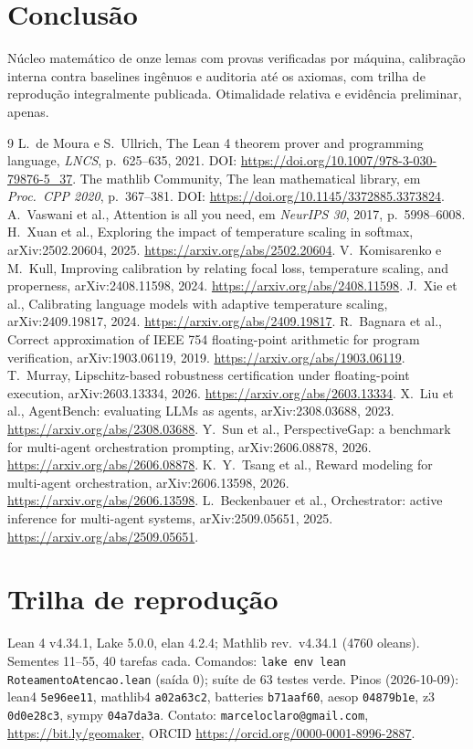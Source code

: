 \documentclass[11pt,a4paper]{article}
\theoremstyle{definition}
\begin{document}
\section{Conclusão}
Núcleo matemático de onze lemas com provas verificadas por máquina, calibração interna contra baselines ingênuos e auditoria até os axiomas, com trilha de reprodução integralmente publicada. Otimalidade relativa e evidência preliminar, apenas.
\begin{thebibliography}{9}
 L.~de Moura e S.~Ullrich, The Lean 4 theorem prover and programming language, \textit{LNCS}, p.\ 625--635, 2021. DOI: \url{https://doi.org/10.1007/978-3-030-79876-5_37}.
 The mathlib Community, The lean mathematical library, em \textit{Proc.\ CPP 2020}, p.\ 367--381. DOI: \url{https://doi.org/10.1145/3372885.3373824}.
 A.~Vaswani et al., Attention is all you need, em \textit{NeurIPS 30}, 2017, p.\ 5998--6008.
 H.~Xuan et al., Exploring the impact of temperature scaling in softmax, arXiv:2502.20604, 2025. \url{https://arxiv.org/abs/2502.20604}.
 V.~Komisarenko e M.~Kull, Improving calibration by relating focal loss, temperature scaling, and properness, arXiv:2408.11598, 2024. \url{https://arxiv.org/abs/2408.11598}.
 J.~Xie et al., Calibrating language models with adaptive temperature scaling, arXiv:2409.19817, 2024. \url{https://arxiv.org/abs/2409.19817}.
 R.~Bagnara et al., Correct approximation of IEEE 754 floating-point arithmetic for program verification, arXiv:1903.06119, 2019. \url{https://arxiv.org/abs/1903.06119}.
 T.~Murray, Lipschitz-based robustness certification under floating-point execution, arXiv:2603.13334, 2026. \url{https://arxiv.org/abs/2603.13334}.
 X.~Liu et al., AgentBench: evaluating LLMs as agents, arXiv:2308.03688, 2023. \url{https://arxiv.org/abs/2308.03688}.
 Y.~Sun et al., PerspectiveGap: a benchmark for multi-agent orchestration prompting, arXiv:2606.08878, 2026. \url{https://arxiv.org/abs/2606.08878}.
 K.~Y.~Tsang et al., Reward modeling for multi-agent orchestration, arXiv:2606.13598, 2026. \url{https://arxiv.org/abs/2606.13598}.
 L.~Beckenbauer et al., Orchestrator: active inference for multi-agent systems, arXiv:2509.05651, 2025. \url{https://arxiv.org/abs/2509.05651}.
\end{thebibliography}
\appendix
\section{Trilha de reprodução}
Lean 4 v4.34.1, Lake 5.0.0, elan 4.2.4; Mathlib rev.\ v4.34.1 (4760 oleans). Sementes 11--55, 40 tarefas cada. Comandos: \texttt{lake env lean RoteamentoAtencao.lean} (saída 0); suíte de 63 testes verde. Pinos (2026-10-09): lean4 \texttt{5e96ee11}, mathlib4 \texttt{a02a63c2}, batteries \texttt{b71aaf60}, aesop \texttt{04879b1e}, z3 \texttt{0d0e28c3}, sympy \texttt{04a7da3a}. Contato: \texttt{marceloclaro@gmail.com}, \url{https://bit.ly/geomaker}, ORCID \url{https://orcid.org/0000-0001-8996-2887}.
\end{document}
